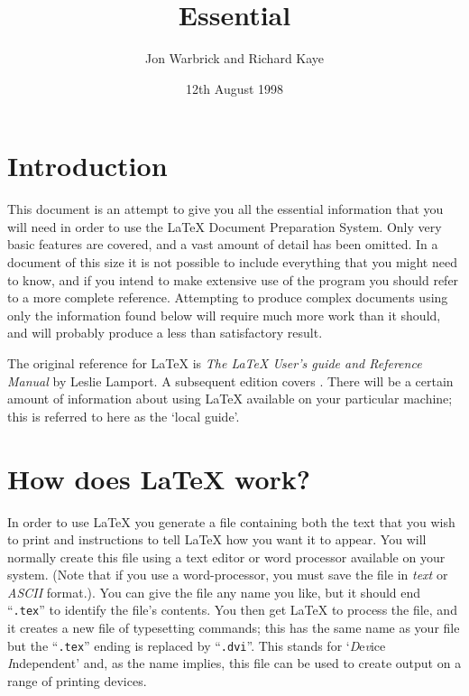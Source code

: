 \documentclass[10pt,a4paper]{article}
\title{Essential \LaTeXe}
\author{Jon Warbrick and Richard Kaye}
\date{12th August 1998}
\newcommand{\fn}[1]{\hbox{\tt #1}}
\begin{document}
\maketitle

\section{Introduction}

This document is an attempt to give you all the essential
information that you will need in order to use the \LaTeX{} Document
Preparation System.  Only very basic features are covered, and a
vast amount of detail has been omitted.  In a document of this size
it is not possible to include everything that you might need to know,
and if you intend to make extensive use of the program you should
refer to a more complete reference.  Attempting to produce complex
documents using only the information found below will require
much more work than it should, and will probably produce a less
than satisfactory result.

The original reference for \LaTeX{} is {\em The \LaTeX{} User's guide and
Reference Manual\/} by Leslie Lamport.  A subsequent edition
covers \LaTeXe.  There will be a certain amount of information about
using \LaTeX{} available on your particular machine; this is referred
to here as the `local guide'.

\section{How does \LaTeX{} work?}

In order to use \LaTeX{} you generate a file containing
both the text that you wish to print and instructions to tell \LaTeX{}
how you want it to appear.  You will normally create
this file using a text editor or word processor available
on your system.  (Note that if you use a word-processor, you must save
the file in \textit{text} or \textit{ASCII} format.).  
You can give the file any name you
like, but it should end ``\fn{.tex}'' to identify the file's contents.
You then get \LaTeX{} to process the file, and it creates a
new file of typesetting commands; this has the same name as your file but
the ``\fn{.tex}'' ending is replaced by ``\fn{.dvi}''.  This stands for
`\textit{D}e\textit{v}ice \textit{I}ndependent' and, as the name implies, 
this file can be used to create output on a range of printing devices.
\end{document}
